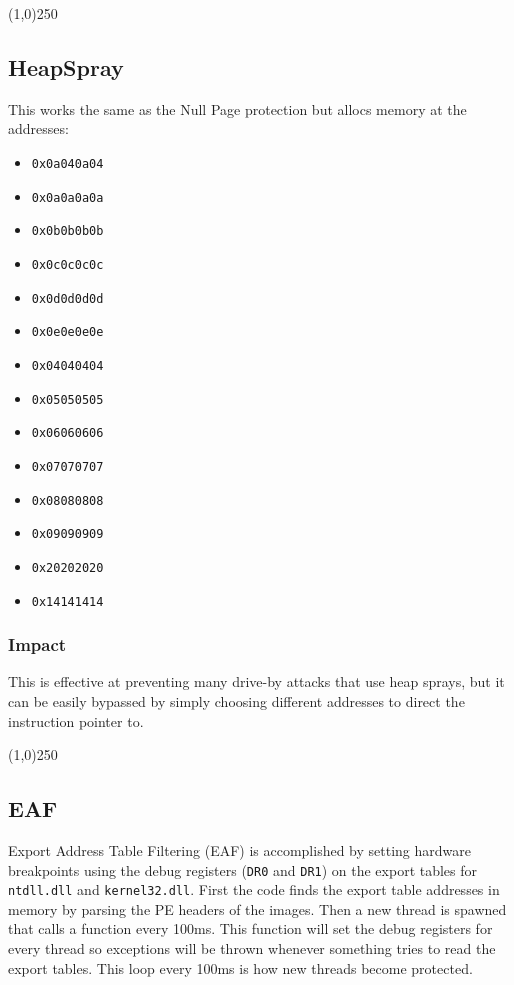 \documentclass[]{article}
\newcommand{\sectionbreakline}[0]{\begin{center}\line(1,0){250}\end{center}}
\begin{document}
\sectionbreakline{}
















\subsection{HeapSpray}\label{heapspray}

This works the same as the Null Page protection but allocs memory at the
addresses:

\begin{itemize}
  \item \texttt{0x0a040a04}
  \item \texttt{0x0a0a0a0a}
  \item \texttt{0x0b0b0b0b}
  \item \texttt{0x0c0c0c0c}
  \item \texttt{0x0d0d0d0d}
  \item \texttt{0x0e0e0e0e}
  \item \texttt{0x04040404}
  \item \texttt{0x05050505}
  \item \texttt{0x06060606}
  \item \texttt{0x07070707}
  \item \texttt{0x08080808}
  \item \texttt{0x09090909}
  \item \texttt{0x20202020}
  \item \texttt{0x14141414}
\end{itemize}


\subsubsection{Impact}
This is effective at preventing many drive-by attacks that use heap sprays, but it can be easily bypassed by simply choosing different addresses to direct the instruction pointer to.

\sectionbreakline{}






\subsection{EAF}\label{eaf}
Export Address Table Filtering (EAF) is accomplished by setting hardware breakpoints using the debug registers (\texttt{DR0} and \texttt{DR1}) on the export tables for \texttt{ntdll.dll} and \texttt{kernel32.dll}.  First the code finds the export table addresses in memory by parsing the PE headers of the images.  Then a new thread is spawned that calls a function every 100ms.  This function will set the debug registers for every thread so exceptions will be thrown whenever something tries to read the export tables.  This loop every 100ms is how new threads become protected.
\end{document}

